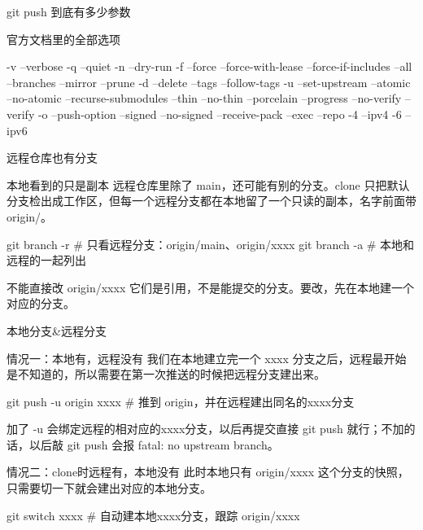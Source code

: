 \documentclass[aspectratio=169]{beamer}
\begin{document}
\begin{frame}[fragile]{git push 到底有多少参数}
\begin{block}{官方文档里的全部选项}
{
\begin{semiverbatim}
-v --verbose          -q --quiet          -n --dry-run
-f --force            --force-with-lease  --force-if-includes
--all --branches      --mirror            --prune
-d --delete           --tags              --follow-tags
-u --set-upstream     --atomic            --no-atomic
--recurse-submodules  --thin              --no-thin
--porcelain           --progress          --no-verify
--verify              -o --push-option    --signed
--no-signed           --receive-pack      --exec
--repo                -4 --ipv4           -6 --ipv6
\end{semiverbatim}
}
\end{block}

\end{frame}

\begin{frame}[fragile]{远程仓库也有分支}
	\begin{block}{本地看到的只是副本}
		\hspace*{2em}远程仓库里除了 main，还可能有别的分支。clone 只把默认分支检出成工作区，但每一个远程分支都在本地留了一个只读的副本，名字前面带 origin/。
\begin{semiverbatim}
git branch -r      # 只看远程分支：origin/main、origin/xxxx
git branch -a      # 本地和远程的一起列出
\end{semiverbatim}
	\end{block}
	\begin{block}{不能直接改 origin/xxxx}
		\hspace*{2em}它们是引用，不是能提交的分支。要改，先在本地建一个对应的分支。
	\end{block}
\end{frame}

\begin{frame}[fragile]{本地分支\&远程分支}
\begin{block}{情况一：本地有，远程没有}
我们在本地建立完一个 xxxx 分支之后，远程最开始是不知道的，所以需要在第一次推送的时候把远程分支建出来。
\begin{semiverbatim}
git push -u origin xxxx    # 推到 origin，并在远程建出同名的xxxx分支
\end{semiverbatim}
加了 -u 会绑定远程的相对应的xxxx分支，以后再提交直接 git push 就行；不加的话，以后敲 git push 会报 fatal: no upstream branch。
\end{block}
\begin{block}{情况二：clone时远程有，本地没有}
此时本地只有 origin/xxxx 这个分支的快照，只需要切一下就会建出对应的本地分支。
\begin{semiverbatim}
git switch xxxx           # 自动建本地xxxx分支，跟踪 origin/xxxx
\end{semiverbatim}
\end{block}
\end{frame}
\end{document}
